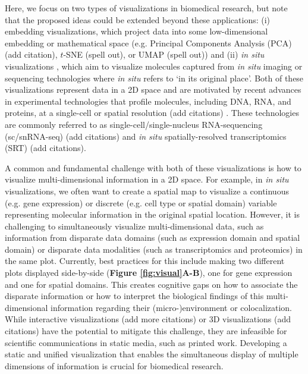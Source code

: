 \documentclass[10pt,twocolumn]{article}
\newcommand{\fixme}[1]{{\color{red} (#1)}}
\begin{document}
Here, we focus on two types of visualizations in biomedical research, but note that the proposed ideas could be extended beyond these applications: (i) embedding visualizations, which project data into some low-dimensional embedding or mathematical space (e.g. Principal Components Analysis (PCA) \fixme{add citation}, $t$-SNE \cite{hinton_2002} \fixme{spell out}, or UMAP \cite{becht_2019} \fixme{spell out}) and (ii) \textit{in situ} visualizations \cite{dries_2021, Lewis_2021, odonoghue_2021}, which aim to visualize molecules captured from \textit{in situ} imaging or sequencing technologies where \textit{in situ} refers to `in its original place'. Both of these visualizations represent data in a 2D space and are motivated by recent advances in experimental technologies that profile molecules, including DNA, RNA, and proteins, at a single-cell or spatial resolution \fixme{add citations} \cite{moffitt_2022}. These technologies are commonly referred to as single-cell/single-nucleus RNA-sequencing (sc/snRNA-seq) \fixme{add citations} and \textit{in situ} spatially-resolved transcriptomics (SRT) \fixme{add citations}.  

A common and fundamental challenge with both of these visualizations is how to visualize multi-dimensional information in a 2D space. For example, in \textit{in situ} visualizations, we often want to create a spatial map to visualize a continuous (e.g. gene expression) or discrete (e.g. cell type or spatial domain) variable representing molecular information in the original spatial location. However, it is challenging to simultaneously visualize multi-dimensional data, such as information from disparate data domains (such as expression domain and spatial domain) or disparate data modalities (such as transcriptomics and proteomics) in the same plot. Currently, best practices for this include making two different plots displayed side-by-side (\textbf{Figure \textbf{\ref{fig:visual}A-B}}), one for gene expression and one for spatial domains. This creates cognitive gaps on how to associate the disparate information or how to interpret the biological findings of this multi-dimensional information regarding their (micro-)environment or colocalization. While interactive visualizations \cite{sriworarat_2023} \fixme{add more citations} or 3D visualizations \fixme{add citations} have the potential to mitigate this challenge, they are infeasible for scientific communications in static media, such as printed work. Developing a static and unified visualization that enables the simultaneous display of multiple dimensions of information is crucial for biomedical research.
\end{document}
